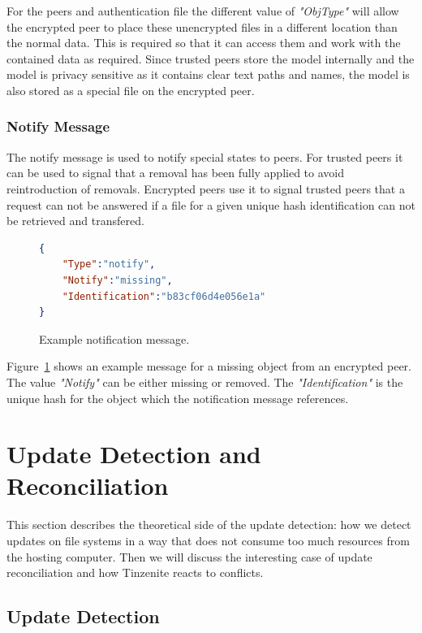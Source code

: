 For the peers and authentication file the different value of \textit{"ObjType"} will allow the encrypted peer to place these unencrypted files in a different location than the normal data.
This is required so that it can access them and work with the contained data as required.
Since trusted peers store the model internally and the model is privacy sensitive as it contains clear text paths and names, the model is also stored as a special file on the encrypted peer.

\subsubsection{Notify Message}
\label{subs:Notify Message}

The notify message is used to notify special states to peers.
For trusted peers it can be used to signal that a removal has been fully applied to avoid reintroduction of removals.
Encrypted peers use it to signal trusted peers that a request can not be answered if a file for a given unique hash identification can not be retrieved and transfered.

\begin{figure}[htp]
    \begin{lstlisting}[language=json,firstnumber=0]
{
    "Type":"notify",
    "Notify":"missing",
    "Identification":"b83cf06d4e056e1a"
}
    \end{lstlisting}
\caption[Notify Message]{Example notification message.}
\label{json:notify_message}
\end{figure}

Figure~\ref{json:notify_message} shows an example message for a missing object from an encrypted peer.
The value \textit{"Notify"} can be either missing or removed.
The \textit{"Identification"} is the unique hash for the object which the notification message references.

\section{Update Detection and Reconciliation}
\label{sec:Update Detection and Reconciliation}

This section describes the theoretical side of the update detection: how we detect updates on file systems in a way that does not consume too much resources from the hosting computer.
Then we will discuss the interesting case of update reconciliation and how Tinzenite reacts to conflicts.

\subsection{Update Detection}
\label{sub:Update Detection}

